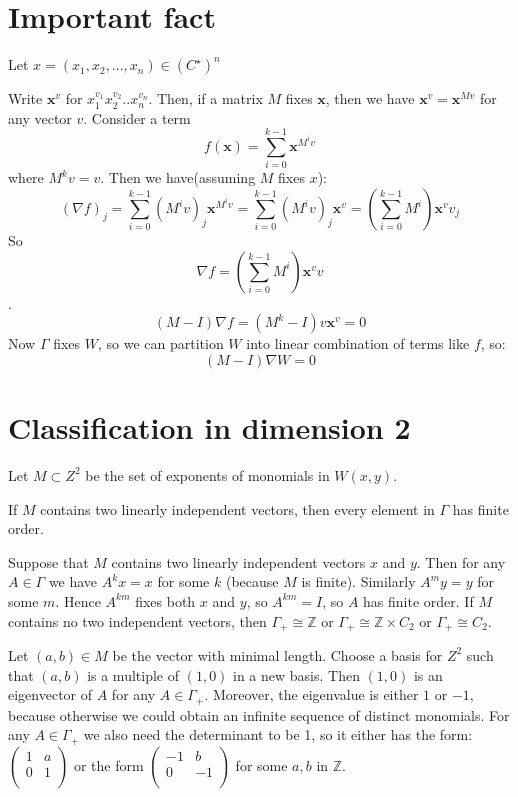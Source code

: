 \documentclass[a4paper]{article}
\begin{document}
	\section{Important fact}
	Let $x = (x_1, x_2, ..., x_n) \in (C^{\star})^n$
	
	Write $\textbf{x}^v$ for $x_1^{v_1} x_2^{v_2} .. x_n^{v_n}$. Then, if a matrix $M$ fixes $\textbf{x}$, then we have $\textbf{x}^v = \textbf{x}^{Mv}$ for any vector $v$.
	Consider a term 
	$$f(\textbf{x}) = \sum_{i=0}^{k-1} \textbf{x}^{M^i v}$$
	where $M^k v =v$.
	Then we have(assuming $M$ fixes $x$):
	$$(\nabla f)_j = \sum_{i=0}^{k-1} (M^i v)_j \textbf{x}^{M^i v} = \sum_{i=0}^{k-1} (M^i v)_j \textbf{x}^{v} = (\sum_{i=0}^{k-1} M^i) \textbf{x}^{v} v_j$$
	So $$\nabla f = (\sum_{i=0}^{k-1} M^i) \textbf{x}^{v} v$$.
	$$(M-I)\nabla f= (M^k-I)v \textbf{x}^{v}= 0$$
	Now $\Gamma$ fixes $W$, so we can partition $W$ into linear combination of terms like $f$, so:
	$$(M-I)\nabla W = 0$$
    \section{Classification in dimension 2}
    	Let $M \subset Z^2$ be the set of exponents of monomials in $W(x,y)$.
    
    \clm If $M$ contains two linearly independent vectors, then every element in $\Gamma$ has finite order.
    
    Suppose that $M$ contains two linearly independent vectors $x$ and $y$. Then for any $A \in \Gamma$ we have $A^k x= x$ for some $k$ (because $M$ is finite). Similarly $A^m y = y$ for some $m$. Hence $A^{k m}$ fixes both $x$ and $y$, so $A^{k m} = I$, so $A$ has finite order.
    \clm If $M$ contains no two independent vectors, then $\Gamma_+ \cong \mathbb{Z}$ or $\Gamma_+ \cong \mathbb{Z} \times C_{2}$ or $\Gamma_+ \cong C_{2}$.
    
    Let $(a,b) \in M$ be the vector with minimal length.
    Choose a basis for $Z^2$ such that $(a,b)$ is a multiple of $(1,0)$ in a new basis. Then $(1,0)$ is an eigenvector of $A$ for any $A \in \Gamma_+$. Moreover, the eigenvalue is either $1$ or $-1$, because otherwise we could obtain an infinite sequence of distinct monomials. For any $A \in \Gamma_+$ we also need the determinant to be 1, so it either has the form:
    $\begin{pmatrix}
    1 & a \\
    0 & 1 \\
    \end{pmatrix}$ or the form 
    $\begin{pmatrix}
    -1 & b \\
    0 & -1 \\
    \end{pmatrix}$
    for some $a, b$ in $\mathbb{Z}$.
    
\end{document}

